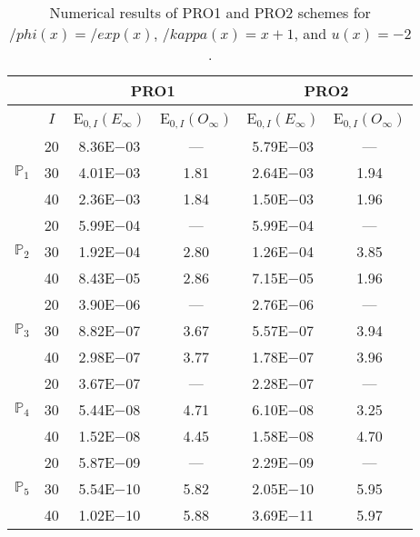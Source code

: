 \begin{table}[H]
\caption{Numerical results of PRO1 and PRO2 schemes for $/phi(x)=/exp(x)$, $/kappa(x)=x+1$, and $u(x)=-2$.}
\setlength{\tabcolsep}{5pt}
\centering
\begin{tabular}{@{}l c c c c c@{}}
\toprule
 &  & \multicolumn{2}{c}{PRO1} & \multicolumn{2}{c}{PRO2}\\
\midrule
 & $I$ & E$_{0,I}(E_{\infty})$ & E$_{0,I}(O_{\infty})$ & E$_{0,I}(E_{\infty})$ & E$_{0,I}(O_{\infty})$\\
\midrule
\multirow{3}{*}{$\mathbb{P}_{1}$}
 & 20 & 8.36E$-$03 & --- & 5.79E$-$03 & ---\\
 & 30 & 4.01E$-$03 & 1.81 & 2.64E$-$03 & 1.94 \\
 & 40 & 2.36E$-$03 & 1.84 & 1.50E$-$03 & 1.96 \\
\midrule
\multirow{3}{*}{$\mathbb{P}_{2}$}
 & 20 & 5.99E$-$04 & --- & 5.99E$-$04 & ---\\
 & 30 & 1.92E$-$04 & 2.80 & 1.26E$-$04 & 3.85 \\
 & 40 & 8.43E$-$05 & 2.86 & 7.15E$-$05 & 1.96 \\
\midrule
\multirow{3}{*}{$\mathbb{P}_{3}$}
 & 20 & 3.90E$-$06 & --- & 2.76E$-$06 & ---\\
 & 30 & 8.82E$-$07 & 3.67 & 5.57E$-$07 & 3.94 \\
 & 40 & 2.98E$-$07 & 3.77 & 1.78E$-$07 & 3.96 \\
\midrule
\multirow{3}{*}{$\mathbb{P}_{4}$}
 & 20 & 3.67E$-$07 & --- & 2.28E$-$07 & ---\\
 & 30 & 5.44E$-$08 & 4.71 & 6.10E$-$08 & 3.25 \\
 & 40 & 1.52E$-$08 & 4.45 & 1.58E$-$08 & 4.70 \\
\midrule
\multirow{3}{*}{$\mathbb{P}_{5}$}
 & 20 & 5.87E$-$09 & --- & 2.29E$-$09 & ---\\
 & 30 & 5.54E$-$10 & 5.82 & 2.05E$-$10 & 5.95 \\
 & 40 & 1.02E$-$10 & 5.88 & 3.69E$-$11 & 5.97 \\
\bottomrule
\end{tabular}
\label{Table:PRO:Test5}
\end{table}
